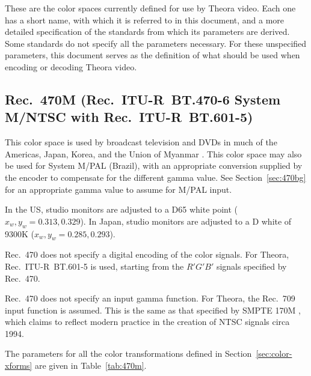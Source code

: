 \documentclass[11pt,letterpaper]{book}
\numberwithin{equation}{chapter}
\numberwithin{figure}{chapter}
\numberwithin{table}{chapter}
\begin{document}
These are the color spaces currently defined for use by Theora video.
Each one has a short name, with which it is referred to in this document, and
 a more detailed specification of the standards from which its parameters are
 derived.
Some standards do not specify all the parameters necessary.
For these unspecified parameters, this document serves as the definition of
 what should be used when encoding or decoding Theora video.

\subsection{Rec.~470M (Rec.~ITU-R~BT.470-6 System M/NTSC with
 Rec.~ITU-R~BT.601-5)}
\label{sec:470m}

This color space is used by broadcast television and DVDs in much of the
 Americas, Japan, Korea, and the Union of Myanmar \cite{rec470}.
This color space may also be used for System M/PAL (Brazil), with an
 appropriate conversion supplied by the encoder to compensate for the
 different gamma value.
See Section~\ref{sec:470bg} for an appropriate gamma value to assume for M/PAL
 input.

In the US, studio monitors are adjusted to a D65 white point
 ($x_w,y_w=0.313,0.329$).
In Japan, studio monitors are adjusted to a D white of 9300K
 ($x_w,y_w=0.285,0.293$).

Rec.~470 does not specify a digital encoding of the color signals.
For Theora, Rec.~ITU-R~BT.601-5 \cite{rec601} is used, starting from the
 $R'G'B'$ signals specified by Rec.~470.

Rec.~470 does not specify an input gamma function.
For Theora, the Rec.~709 \cite{rec709} input function is assumed.
This is the same as that specified by SMPTE 170M \cite{smpte170m}, which claims
 to reflect modern practice in the creation of NTSC signals circa 1994.

The parameters for all the color transformations defined in
 Section~\ref{sec:color-xforms} are given in Table~\ref{tab:470m}.
\end{document}
